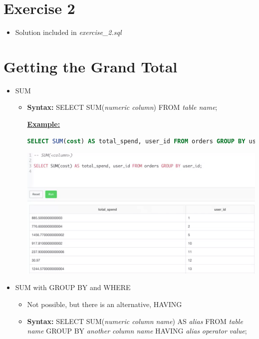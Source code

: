 \documentclass[12pt]{article}
\begin{document}
\section{Exercise 2}

\bigskip

\begin{itemize}
    \item Solution included in \textit{exercise\_2.sql}
\end{itemize}

\bigskip

\section{Getting the Grand Total}

\bigskip

\begin{itemize}
    \item SUM
    \begin{itemize}
        \item \textbf{Syntax:} SELECT SUM(\textit{numeric column}) FROM \textit{table name};

    \bigskip

    \underline{\textbf{Example:}}

    \bigskip

    \begin{lstlisting}[language=SQL]
    SELECT SUM(cost) AS total_spend, user_id FROM orders GROUP BY user_id;
    \end{lstlisting}

    \bigskip

    \begin{center}
    \includegraphics[width=\linewidth]{images/part_3_notes_2.png}
    \end{center}

    \end{itemize}
    \item SUM with GROUP BY and WHERE
    \begin{itemize}
        \item Not possible, but there is an alternative, HAVING
        \item \textbf{Syntax:} SELECT SUM(\textit{numeric column name}) AS \textit{alias} FROM \textit{table name}
        GROUP BY \textit{another column name} HAVING \textit{alias} \textit{operator} \textit{value};


\end{itemize}
\end{itemize}
\end{document}
